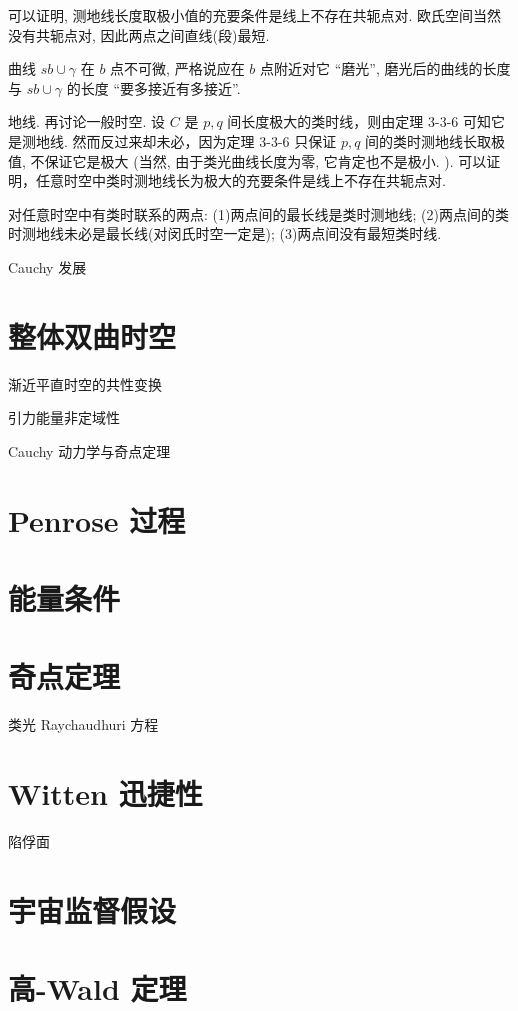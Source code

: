 可以证明, 测地线长度取极小值的充要条件是线上不存在共轭点对. 欧氏空间当然没有共轭点对, 因此两点之间直线(段)最短.


曲线 $s b \cup \gamma$ 在 $b$ 点不可微, 严格说应在 $b$ 点附近对它 “磨光”, 磨光后的曲线的长度与 $s b \cup \gamma$ 的长度 “要多接近有多接近”.



地线. 再讨论一般时空. 设 $C$ 是 $p, q$ 间长度极大的类时线，则由定理 3-3-6 可知它是测地线. 然而反过来却未必，因为定理 3-3-6 只保证 $p, q$ 间的类时测地线长取极值, 不保证它是极大 (当然, 由于类光曲线长度为零, 它肯定也不是极小. ). 可以证明，任意时空中类时测地线长为极大的充要条件是线上不存在共轭点对. 


 对任意时空中有类时联系的两点: (1)两点间的最长线是类时测地线; (2)两点间的类时测地线未必是最长线(对闵氏时空一定是); (3)两点间没有最短类时线.


Cauchy 发展

\section{整体双曲时空}

渐近平直时空的共性变换

引力能量非定域性

Cauchy 动力学与奇点定理

\section{Penrose 过程}

\section{能量条件}
\section{奇点定理}


类光 Raychaudhuri 方程
\section{Witten 迅捷性}
陷俘面
\section{宇宙监督假设}
\section{高-Wald 定理}


